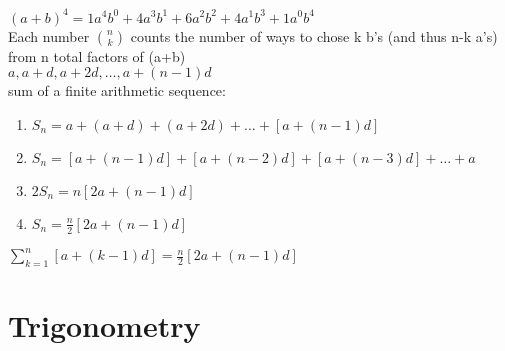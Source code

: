 \documentclass{article}
\begin{document}
$(a + b)^4 = 1a^4b^0 + 4a^3b^1 + 6a^2b^2 + 4a^1b^3 + 1a^0b^4$\\

Each number $\binom{n}{k}$ counts the number of ways to chose k b's (and thus n-k a's) from n total factors of (a+b)\\

$a, a + d, a + 2d, \ldots, a + (n - 1)d$\\

sum of a finite arithmetic sequence:
	\begin{enumerate}
		\item $S_n = a + (a + d) + (a + 2d) + \ldots + [a + (n - 1)d]$ 
		\item $S_n = [a + (n - 1)d] + [a + (n - 2)d] + [a + (n - 3)d] + \ldots + a$
		\item $2S_n = n[2a + (n - 1)d]$ 
		\item $S_n = \frac{n}{2}[2a + (n - 1)d]$
	\end{enumerate}

$\sum_{k = 1}^{n}[a + (k - 1)d] = \frac{n}{2}[2a + (n - 1)d]$

\newpage
\section*{Trigonometry}

\begin{center}
\end{center}
\end{document}
